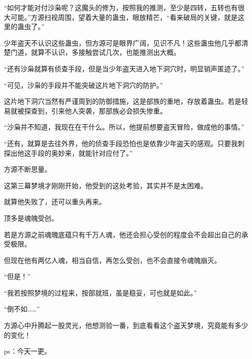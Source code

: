\begin{this_body}
“如何才能对付沙枭呢？这魔头的修为，按照我的推测，至少是四转，五转也有很大可能。”方源扫视周围，望着大量的蛊虫，眼放精芒，“看来破局的关键，就是这里的蛊虫了。”

少年盗天不认识这些蛊虫，但方源可是眼界广阔，见识不凡！这些蛊虫他几乎都清楚门道，就算不认识，多接触尝试几次，也能推测出大概。

“还有沙枭就算有侦查手段，但是当少年盗天进入地下洞穴时，明显销声匿迹了。”

“可见，沙枭的手段并不能突破这片地下洞穴的防护。”

这片地下洞穴当然有严谨周到的防御措施，这是部族的重地，存放着蛊虫。若是轻易就被探查到，引来他人突袭，那部族必会损失惨重。

“沙枭并不知道，我现在在干什么。所以，他提前想要盗天冒险，做成他的事情。”

“还有，就算是去往外界，他的侦查手段恐怕也是依靠少年盗天的感观。只要我刺探出他这手段的奥妙来，就能针对应付了。”

方源不断思量。

这第三幕梦境才刚刚开始，他受到的这处考验，其实并不是太困难。

就算他失败了，还可以重头再来。

顶多是魂魄受创。

若是方源之前魂魄底蕴只有千万人魂，他还会担心受创的程度会不会超出自己的承受极限。

但现在他有两亿人魂，相当自信，再怎么受创，也不会直接令魂魄崩灭。

“但是！”

“我若按照梦境的过程来，按部就班，虽是稳妥，可也就是如此。”

“倒不如……”

方源心中升腾起一股灵光，他想测验一番，到底看看这个盗天梦境，究竟能有多少的变化！

ps：今天一更。

\end{this_body}

